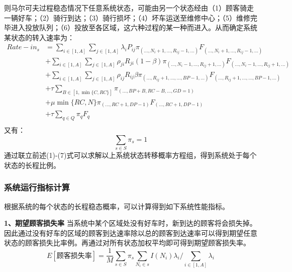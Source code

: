 \documentclass{article}
\begin{document}
则马尔可夫过程稳态情况下任意系统状态，可能由另一个状态经由（1）顾客骑走一辆好车；（2）骑行到达；（3）骑行损坏；（4）坏车运送至维修中心；（5）维修完毕进入投放队列；（6）投放至各区域，这六种过程的某一种而进入。从而确定系统某状态的转入速率为：
\begin{equation}
    \begin{aligned}
        Rate-in_{s} &= 
        \sum \limits _{i \in [1,A]} \sum \limits _{j \in [1,A]} \lambda_i P_{ij} \pi_{(\dots, N_i+1, \dots ,R_{ij}-1,\dots)} F_{(\dots, N_i+1, \dots ,R_{ij}-1,\dots)}\\
        &+\sum \limits _{i \in [1,A]} \sum \limits _{j \in [1,A]} \rho_{ji} R_{ji} (1-\beta) \pi_{(\dots, N_i-1, \dots ,R_{ij}+1,\dots)} F_{(\dots, N_i-1, \dots ,R_{ij}+1,\dots)}\\
        &+\sum \limits _{i \in [1,A]} \sum \limits _{j \in [1,A]} \rho_{ij} R_{ij} \beta \pi_{(\dots ,R_{ij}+1, \dots, \dots, BP-1, \dots)} F_{(\dots ,R_{ij}+1, \dots, \dots, BP-1, \dots)}\\
        &+\tau \sum \limits _{B \in [1,\min\{C, RC\}] } \pi_{(\dots, BP+B, RC-B, \dots, GD=1)} \\
        &+\mu \min \{RC, N\} \pi_{(\dots, RC+1, DP-1)} F_{(\dots, RC+1, DP-1)}\\
        &+\tau \sum \limits _{q \in Q}\pi_{q} F_{q}\\
    \end{aligned}
\end{equation}
又有：
\begin{equation}
    \sum \limits _{s \in S} \pi_{s} = 1
\end{equation}
通过联立前述(1)-(7)式可以求解以上系统状态转移概率方程组，得到系统处于每个状态的长程比例。

\subsubsection{系统运行指标计算}
根据系统的每个状态的长程稳态概率，可以计算得到如下系统性能指标。

\textbf{1、期望顾客损失率}
当系统中某个区域处没有好车时，新到达的顾客将会损失掉。因此通过没有好车的区域的顾客到达速率除以总的顾客到达速率可以得到期望任意状态的顾客损失比率例。再通过对所有状态加权平均即可得到期望顾客损失率。
\begin{equation}
E[\mbox{顾客损失率}] = \frac{1}{M} \sum \limits _{s \in S} \pi_{s} \sum \limits _{N_i \in s} I(N_i) \lambda_i / \sum \limits _{i \in [1,A]} \lambda_i 
\end{equation}
\end{document}
